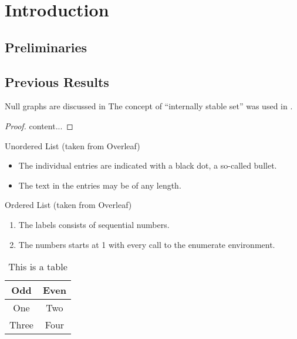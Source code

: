 \section{Introduction}
\label{sec:intro}

\lipsum[2]

\subsection{Preliminaries}
\label{sec:pre}

\lipsum[3]

\subsection{Previous Results}
\label{sec:prev-results}

Null graphs are discussed in \cite{HararyR74}
The concept of ``internally stable set'' was used in \cite{Berge57, Berge58}.

\begin{theorem}
	\label{thrm:1}
	\lipsum[4]
\end{theorem}
\begin{proof}
	content...
\end{proof}

\begin{corollary}
\label{cor:1}

\lipsum[5]
\end{corollary}

Unordered List (taken from Overleaf)
\begin{itemize}
	\item The individual entries are indicated with a black dot, a so-called bullet.
	\item The text in the entries may be of any length.
\end{itemize}

Ordered List (taken from Overleaf)
\begin{enumerate}
	\item The labels consists of sequential numbers.
	\item The numbers starts at 1 with every call to the enumerate environment.
\end{enumerate}

\begin{table}[ht]
	\centering
	\begin{tabular}{|c|c|}
		\hline
		\textbf{Odd} & \textbf{Even} \\
		\hline\hline
		One & Two \\
		\hline
		Three & Four \\
		\hline
	\end{tabular}
	\caption{This is a table}
	\label{tbl:1}
\end{table}

